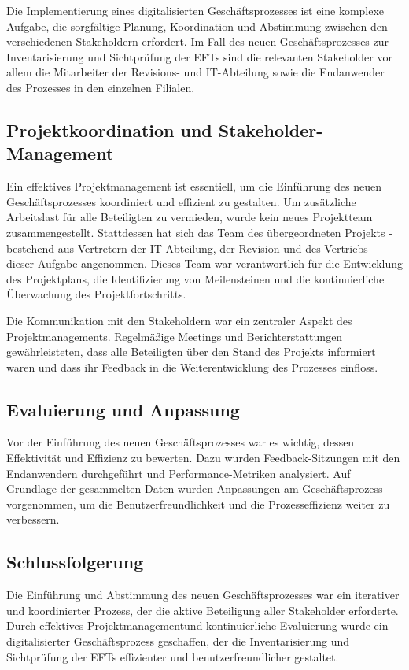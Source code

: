 \documentclass[12pt, a4paper]{article}
\begin{document}
Die Implementierung eines digitalisierten Geschäftsprozesses ist eine komplexe Aufgabe, die sorgfältige Planung, Koordination und Abstimmung zwischen den verschiedenen 
Stakeholdern erfordert. Im Fall des neuen Geschäftsprozesses zur Inventarisierung und Sichtprüfung der EFTs sind die relevanten Stakeholder vor allem die Mitarbeiter 
der Revisions- und IT-Abteilung sowie die Endanwender des Prozesses in den einzelnen Filialen.


\subsection{Projektkoordination und Stakeholder-Management}

Ein effektives Projektmanagement ist essentiell, um die Einführung des neuen Geschäftsprozesses koordiniert und effizient zu gestalten. 
Um zusätzliche Arbeitslast für alle Beteiligten zu vermieden, wurde kein neues Projektteam zusammengestellt. Stattdessen hat sich das Team des übergeordneten Projekts - 
bestehend aus Vertretern der IT-Abteilung, der Revision und des Vertriebs - dieser Aufgabe angenommen. Dieses Team war verantwortlich für die Entwicklung des Projektplans, 
die Identifizierung von Meilensteinen und die kontinuierliche Überwachung des Projektfortschritts.

Die Kommunikation mit den Stakeholdern war ein zentraler Aspekt des Projektmanagements. Regelmäßige Meetings und Berichterstattungen gewährleisteten, 
dass alle Beteiligten über den Stand des Projekts informiert waren und dass ihr Feedback in die Weiterentwicklung des Prozesses einfloss. 

\subsection{Evaluierung und Anpassung}

Vor der Einführung des neuen Geschäftsprozesses war es wichtig, dessen Effektivität und Effizienz zu bewerten. Dazu wurden Feedback-Sitzungen mit den Endanwendern 
durchgeführt und Performance-Metriken analysiert. Auf Grundlage der gesammelten Daten wurden Anpassungen am Geschäftsprozess vorgenommen, um die Benutzerfreundlichkeit und 
die Prozesseffizienz weiter zu verbessern.

\subsection{Schlussfolgerung}

Die Einführung und Abstimmung des neuen Geschäftsprozesses war ein iterativer und koordinierter Prozess, der die aktive Beteiligung aller Stakeholder erforderte. 
Durch effektives Projektmanagementund kontinuierliche Evaluierung wurde ein digitalisierter Geschäftsprozess geschaffen, der die Inventarisierung 
und Sichtprüfung der EFTs effizienter und benutzerfreundlicher gestaltet.
\end{document}
